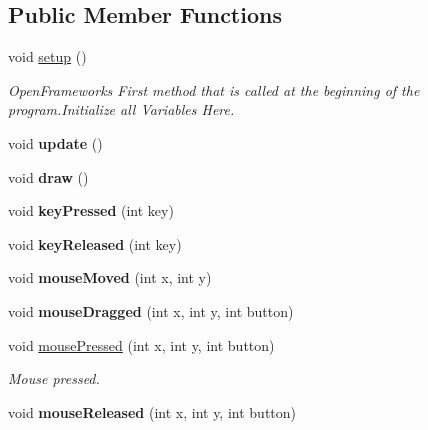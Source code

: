 \subsection*{Public Member Functions}
\begin{DoxyCompactItemize}
\item 
\hypertarget{group___open_frame_works_gad431db15b6150b965cd52bcba8e16e11}{void \hyperlink{group___open_frame_works_gad431db15b6150b965cd52bcba8e16e11}{setup} ()}\label{group___open_frame_works_gad431db15b6150b965cd52bcba8e16e11}

\begin{DoxyCompactList}\small\item\em Open\-Frameworks First method that is called at the beginning of the program.\-Initialize all Variables Here. \end{DoxyCompactList}\item 
\hypertarget{group___open_frame_works_gafb39d201aec71a295b7609876bf7d0c6}{void {\bfseries update} ()}\label{group___open_frame_works_gafb39d201aec71a295b7609876bf7d0c6}

\item 
\hypertarget{group___open_frame_works_gaf869cba67b1dab8481f8d0e216d59dcd}{void {\bfseries draw} ()}\label{group___open_frame_works_gaf869cba67b1dab8481f8d0e216d59dcd}

\item 
\hypertarget{group___open_frame_works_ga904d147c7e532cb92656d5dd4895cd26}{void {\bfseries key\-Pressed} (int key)}\label{group___open_frame_works_ga904d147c7e532cb92656d5dd4895cd26}

\item 
\hypertarget{group___open_frame_works_ga1116a10088e4932f6d482efe723cd45e}{void {\bfseries key\-Released} (int key)}\label{group___open_frame_works_ga1116a10088e4932f6d482efe723cd45e}

\item 
\hypertarget{group___open_frame_works_ga33541b19eff9f8285b2487bfc146d58b}{void {\bfseries mouse\-Moved} (int x, int y)}\label{group___open_frame_works_ga33541b19eff9f8285b2487bfc146d58b}

\item 
\hypertarget{group___open_frame_works_ga075bcc2be16fd8f3eaa9162fb40a0a1f}{void {\bfseries mouse\-Dragged} (int x, int y, int button)}\label{group___open_frame_works_ga075bcc2be16fd8f3eaa9162fb40a0a1f}

\item 
void \hyperlink{group___open_frame_works_ga3f200702ce91859cac2872a39302679d}{mouse\-Pressed} (int x, int y, int button)
\begin{DoxyCompactList}\small\item\em Mouse pressed. \end{DoxyCompactList}\item 
\hypertarget{group___open_frame_works_gaa3680ffc782b1e5c451289817f20c9c6}{void {\bfseries mouse\-Released} (int x, int y, int button)}\label{group___open_frame_works_gaa3680ffc782b1e5c451289817f20c9c6}


\end{DoxyCompactItemize}
